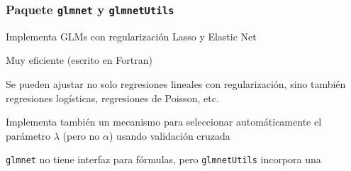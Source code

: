 \documentclass{beamer}
\newenvironment{wideitemize}{\itemize\addtolength{\itemsep}{12pt}}{\enditemize}
\begin{document}
\begin{frame}
\frametitle{Paquete \texttt{glmnet} y \texttt{glmnetUtils}}

\begin{wideitemize}
\item Implementa GLMs con regularización Lasso y Elastic Net

\item Muy eficiente (escrito en Fortran)

\item Se pueden ajustar no solo regresiones lineales con regularización, sino también regresiones logísticas, regresiones de Poisson, etc.

\item Implementa también un mecanismo para seleccionar automáticamente el parámetro $\lambda$ (pero no $\alpha$) usando validación cruzada

\item \texttt{glmnet} no tiene interfaz para fórmulas, pero \texttt{glmnetUtils} incorpora una

\end{wideitemize}
\end{frame}
\end{document}
